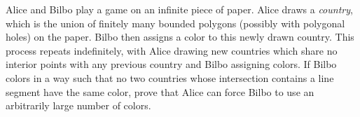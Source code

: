 Alice and Bilbo play a game on an infinite piece of paper. Alice draws a \emph{country}, which is the union of finitely many bounded polygons (possibly with polygonal holes) on the paper. Bilbo then assigns a color to this newly drawn country. This process repeats indefinitely, with Alice drawing new countries which share no interior points with any previous country and Bilbo assigning colors. If Bilbo colors in a way such that no two countries whose intersection contains a line segment have the same color, prove that Alice can force Bilbo to use an arbitrarily large number of colors.